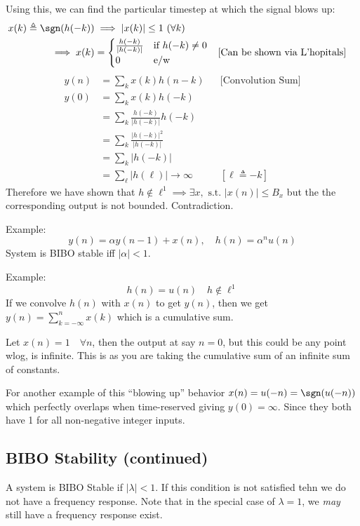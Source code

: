 Using this, we can find the particular timestep at which the signal blows up:
\begin{align*}
    x(k)\triangleq\sgn(h(-k))
    &\implies
    |x(k)|\le1\ (\forall k)
    \\
    \implies
    x(k)
    &= 
    \begin{cases}\frac{h(-k)}{|h(-k)|} & \text{if } h(-k)\ne0\\ 0 & \text{e/w}\end{cases}
    &&\text{[Can be shown via L'hopitals]}
\end{align*}
\begin{align*}
    y(n) 
    &= 
    \sum_k x(k) h(n-k)
    &&\text{[Convolution Sum]}
    \\
    y(0)
    &= 
    \sum_k x(k) h(-k)
    \\
    &= 
    \sum_k \frac{h(-k)}{|h(-k)|} h(-k)
    \\
    &= 
    \sum_k \frac{|h(-k)|^2}{|h(-k)|}
    \\
    &= 
    \sum_k |h(-k)|
    \\
    &= 
    \sum_\ell |h(\ell)| \to \infty
    &&[\ell\triangleq-k]
\end{align*}
Therefore we have shown that $h\not\in\ell^1\implies\exists x, \text{ s.t. } |x(n)|\le B_x$ but the the corresponding output is not bounded. Contradiction.

Example:
\[
    y(n)=\alpha y(n-1)+x(n),\quad h(n)=\alpha^n u(n)
\]
System is BIBO stable iff $|\alpha|<1$.

Example:
\[
    h(n)=u(n)\quad h\not\in\ell^1
\]
If we convolve $h(n)$ with $x(n)$ to get $y(n)$, then we get $y(n)=\sum_{k=-\infty}^n x(k)$ which is a cumulative sum.

Let $x(n)=1\quad\forall n$, then the output at say $n=0$, but this could be any point wlog, is infinite. This is as you are taking the cumulative sum of an infinite sum of constants.

For another example of this ``blowing up'' behavior $x(n)=u(-n)=\sgn(u(-n))$ which perfectly overlaps when time-reserved giving $y(0)=\infty$. Since they both have 1 for all non-negative integer inputs.

\subsection{BIBO Stability (continued)}
A system is BIBO Stable if $|\lambda|<1$. If this condition is not satisfied tehn we do not have a frequency response. Note that in the special case of $\lambda=1$, we \textit{may} still have a frequency response exist.

